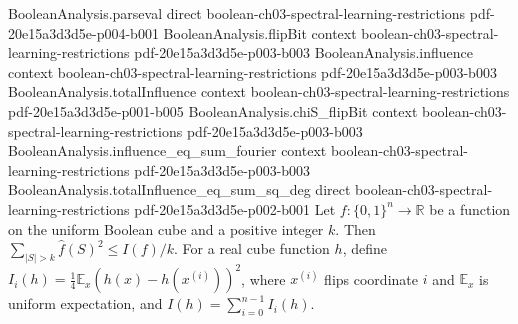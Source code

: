 \begin{lemma}
\proofstep
  {BooleanAnalysis.parseval}
  {direct}
  {boolean-ch03-spectral-learning-restrictions}
  {pdf-20e15a3d3d5e-p004-b001}
\proofstep
  {BooleanAnalysis.flipBit}
  {context}
  {boolean-ch03-spectral-learning-restrictions}
  {pdf-20e15a3d3d5e-p003-b003}
\proofstep
  {BooleanAnalysis.influence}
  {context}
  {boolean-ch03-spectral-learning-restrictions}
  {pdf-20e15a3d3d5e-p003-b003}
\proofstep
  {BooleanAnalysis.totalInfluence}
  {context}
  {boolean-ch03-spectral-learning-restrictions}
  {pdf-20e15a3d3d5e-p001-b005}
\proofstep
  {BooleanAnalysis.chiS_flipBit}
  {context}
  {boolean-ch03-spectral-learning-restrictions}
  {pdf-20e15a3d3d5e-p003-b003}
\proofstep
  {BooleanAnalysis.influence_eq_sum_fourier}
  {context}
  {boolean-ch03-spectral-learning-restrictions}
  {pdf-20e15a3d3d5e-p003-b003}
\proofstep
  {BooleanAnalysis.totalInfluence_eq_sum_sq_deg}
  {direct}
  {boolean-ch03-spectral-learning-restrictions}
  {pdf-20e15a3d3d5e-p002-b001}
Let $f:\{0,1\}^n\to\mathbb R$ be a function on the uniform Boolean cube and a positive
integer $k$. Then $\sum_{|S|>k}\widehat f(S)^2\le I(f)/k$. For a real cube function $h$,
define $I_i(h)=\tfrac14\mathbb E_x(h(x)-h(x^{(i)}))^2$, where $x^{(i)}$ flips coordinate
$i$ and $\mathbb E_x$ is uniform expectation, and $I(h)=\sum_{i=0}^{n-1}I_i(h)$.
\end{lemma}

